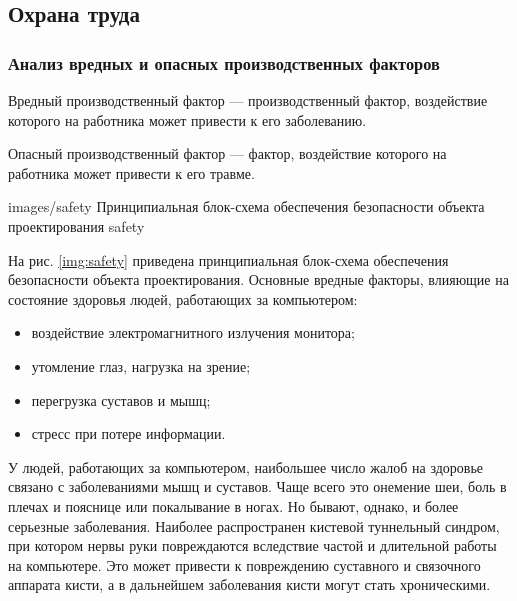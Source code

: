 \subsection{Охрана труда}
\subsubsection{Анализ вредных и опасных производственных факторов}
Вредный производственный фактор --- производственный фактор, воздействие которого на работника может привести к его заболеванию.

Опасный производственный фактор --- фактор, воздействие которого на работника может привести к его травме.

            {images/safety}
            {Принципиальная блок-схема обеспечения безопасности объекта проектирования}
            {safety}

На рис. \ref{img:safety} приведена принципиальная блок-схема обеспечения безопасности объекта проектирования.
Основные вредные факторы, влияющие на состояние здоровья людей, работающих за компьютером:
\begin{itemize}
  \item{воздействие электромагнитного излучения монитора;}
  \item{утомление глаз, нагрузка на зрение;}
  \item{перегрузка суставов и мышц;}
  \item{стресс при потере информации.}
\end{itemize}
У людей, работающих за компьютером, наибольшее число жалоб на здоровье связано с заболеваниями мышц и суставов.
Чаще всего это онемение шеи, боль в плечах и пояснице или покалывание в ногах. Но бывают, однако, и более серьезные заболевания. Наиболее распространен кистевой туннельный синдром, при котором нервы руки повреждаются вследствие частой и длительной работы на компьютере. Это может привести к повреждению суставного и связочного аппарата кисти, а в дальнейшем заболевания кисти могут стать хроническими.
